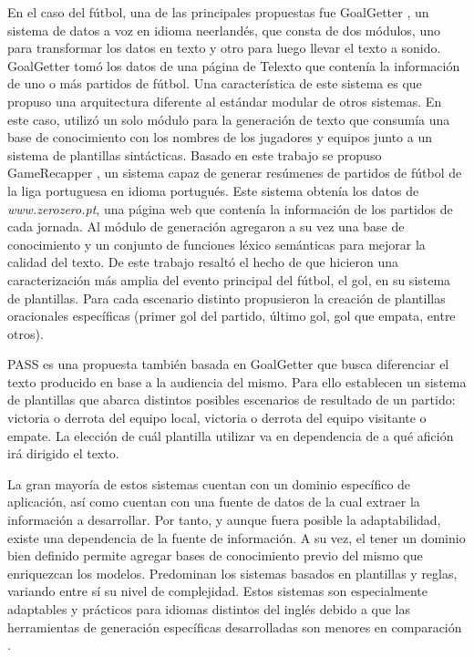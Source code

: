 En el caso del fútbol, una de las principales propuestas fue GoalGetter , un sistema de datos a voz en idioma neerlandés, que consta de dos módulos, uno para transformar los datos en texto y 
otro para luego llevar el texto a sonido. GoalGetter tomó los datos de una página de Telexto que contenía la información de uno o más partidos de fútbol. Una característica de este sistema es que propuso una arquitectura diferente al 
estándar modular de otros sistemas. En este caso, utilizó un solo módulo para la generación de texto que consumía una base de conocimiento con los nombres de los jugadores y equipos junto a un sistema de plantillas sintácticas.
Basado en este trabajo se propuso GameRecapper , un sistema capaz de generar resúmenes de partidos de fútbol de la liga portuguesa en idioma portugués. Este sistema obtenía los datos de \textit{www.zerozero.pt},
una página web que contenía la información de los partidos de cada jornada. Al módulo de generación agregaron a su vez una base de conocimiento y un conjunto de funciones léxico semánticas para mejorar la calidad del texto. De este trabajo resaltó el hecho 
de que hicieron una caracterización más amplia del evento principal del fútbol, el gol, en su sistema de plantillas. Para cada escenario distinto propusieron la creación de plantillas oracionales específicas (primer gol del partido, último gol, gol que empata, entre otros).

PASS  es una propuesta también basada en GoalGetter que busca diferenciar el texto producido en base a la audiencia del mismo. Para ello establecen un sistema de plantillas que abarca distintos posibles escenarios de resultado de un partido: victoria o derrota 
del equipo local, victoria o derrota del equipo visitante o empate. La elección de cuál plantilla utilizar va en dependencia de a qué afición irá dirigido el texto.  

    La gran mayoría de estos sistemas cuentan con un dominio específico de aplicación, así como cuentan con una fuente de datos de la 
cual extraer la información a desarrollar. Por tanto, y aunque fuera posible la adaptabilidad, existe una dependencia de la fuente de información. A su vez, el tener un dominio bien definido  
permite agregar bases de conocimiento previo del mismo que enriquezcan los modelos. Predominan los sistemas basados en plantillas y reglas, variando entre sí su nivel de complejidad. Estos 
sistemas son especialmente adaptables y prácticos para idiomas distintos del inglés debido a que las herramientas de generación específicas desarrolladas son menores en comparación . 


